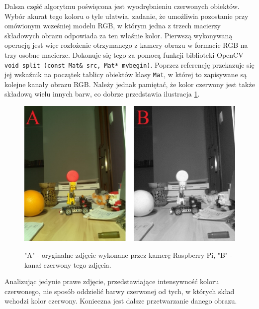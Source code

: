 Dalsza część algorytmu poświęcona jest wyodrębnieniu czerwonych obiektów. Wybór akurat tego koloru o tyle ułatwia, zadanie, że umożliwia pozostanie przy omówionym wcześniej modelu RGB, w którym jedna z trzech macierzy składowych obrazu odpowiada za ten właśnie kolor. Pierwszą wykonywaną operacją jest więc rozłożenie otrzymanego z kamery obrazu w formacie RGB na trzy osobne macierze. Dokonuje się tego za pomocą funkcji biblioteki OpenCV \texttt{void split (const Mat\& src, Mat* mvbegin)}. Poprzez referencję przekazuje się jej wskaźnik na początek tablicy obiektów klasy \texttt{Mat}, w której to zapisywane są kolejne kanały obrazu RGB. Należy jednak pamiętać, że kolor czerwony jest także składową wielu innych barw, co dobrze przedstawia ilustracja \ref{red}.\newpage
\begin{figure}[H]
\begin{center}
\includegraphics[scale=0.42]{imgs/imgBase+Red.jpg}
\caption[Uzyskany kanał czerwony wraz z oryginalny obrazem.]\small{"A" - oryginalne zdjęcie wykonane przez kamerę Raspberry Pi, "B" - kanał czerwony tego zdjęcia.}
\label{red}
\end{center}
\end{figure}
Analizując jedynie prawe zdjęcie, przedstawiające intensywność koloru czerwonego, nie sposób oddzielić barwy czerwonej od tych, w których skład wchodzi kolor czerwony. Konieczna jest dalsze przetwarzanie danego obrazu.

